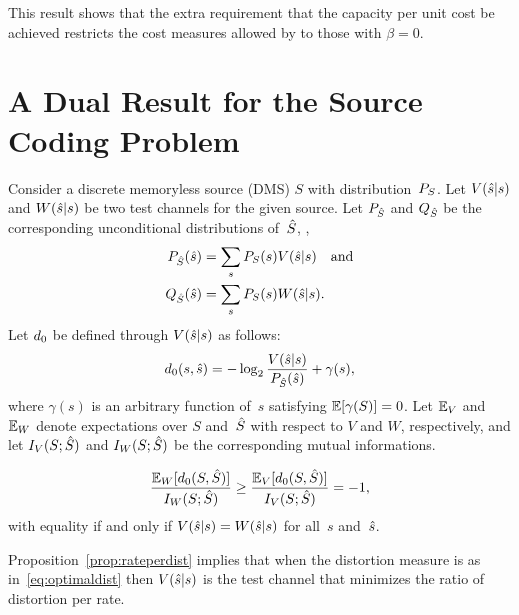 This result shows that the extra requirement that the capacity per unit cost
be achieved restricts the cost measures allowed by  to
those with $\beta = 0$.

\section{A Dual Result for the Source Coding Problem}
\label{sec:rddual}

Consider a discrete memoryless source (DMS) $S$ with distribution~${P_S}$.
Let $V({\hat{s}}|s)$ and $W({\hat{s}}|s)$ be two test channels for the given source. 
Let ${P_{\hat{S}}}$ and ${Q_{\hat{S}}}$ be the
corresponding unconditional distributions of~${\hat{S}}$, \ie,
\begin{align*}
  {P_{\hat{S}}}({\hat{s}}) &= \sum_s {P_S}(s) V({\hat{s}}|s) \quad\text{and} \\
  {Q_{\hat{S}}}({\hat{s}}) &= \sum_s {P_S}(s) W({\hat{s}}|s).
\end{align*}
Let ${d_0}$ be defined through $V({\hat{s}}|s)$ as follows:
\begin{equation}
  \label{eq:optimaldist}
   {d_0}(s, {\hat{s}}) = -\log_2 \frac{V({\hat{s}}|s)}{{P_{\hat{S}}}({\hat{s}})} + \gamma(s),
 \end{equation}
 where $\gamma(s)$ is an arbitrary function of~$s$ satisfying $\mathbb{E}[\gamma(S)] =
 0$. 
Let ${\mathbb{E}_V}$ and ${\mathbb{E}_W}$ denote expectations over $S$ and~${\hat{S}}$ with respect to $V$
and $W$, respectively, and let $I_V(S;{\hat{S}})$ and $I_W(S;{\hat{S}})$ be the
corresponding mutual informations. 

\begin{proposition}
  \label{prop:rateperdist}
  \begin{equation}
    \label{eq:rateperdist}
    \frac{{\mathbb{E}_W}[{d_0}(S,{\hat{S}})]}{I_W(S;{\hat{S}})} \ge \frac{{\mathbb{E}_V}[{d_0}(S,{\hat{S}})]}{I_V(S;{\hat{S}})} =
    -1,
  \end{equation}
  with equality if and only if $V({\hat{s}}|s) = W({\hat{s}}|s)$ for all~$s$ and~${\hat{s}}$.
\end{proposition}

Proposition~\ref{prop:rateperdist} implies that when the distortion measure is
as in~\eqref{eq:optimaldist} then $V({\hat{s}}|s)$ is the test channel that minimizes
the ratio of distortion per rate.

